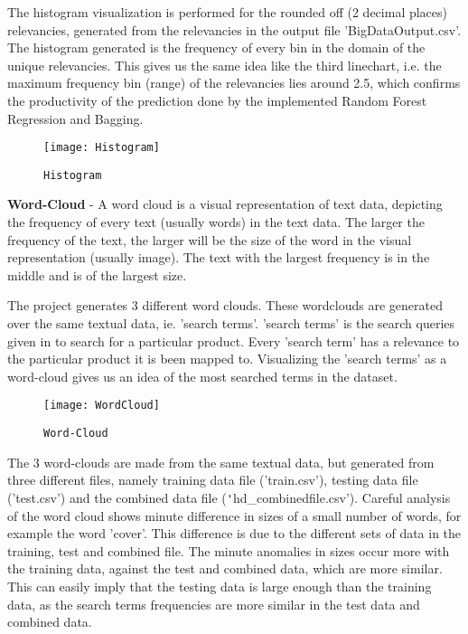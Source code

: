 \documentclass{sig-alternate-05-2015}
\begin{document}
The histogram visualization is performed for the rounded off (2 decimal places) relevancies, generated from the relevancies in the output file 'BigDataOutput.csv'. The histogram generated is the frequency of every bin in the domain of the unique relevancies. This gives us the same idea like the third linechart, i.e. the maximum frequency bin (range) of the relevancies lies around 2.5, which confirms the productivity of the prediction done by the implemented Random Forest Regression and Bagging.\\


\begin{figure}
\centering
\texttt{[image: Histogram]}
\caption{\texttt{Histogram}}
\end{figure}


\textbf{Word-Cloud} - A word cloud is a visual representation of text data, depicting the frequency of every text (usually words) in the text data. The larger the frequency of the text, the larger will be the size of the word in the visual representation (usually image). The text with the largest frequency is in the middle and is of the largest size. \cite{www-wikiTagCloud}


The project generates 3 different word clouds. These wordclouds are generated over the same textual data, ie. 'search terms'. 'search terms' is the search queries given in to search for a particular product. Every 'search term' has a relevance to the particular product it is been mapped to. Visualizing the 'search terms' as a word-cloud gives us an idea of the most searched terms in the dataset.

\begin{figure}
\centering
\texttt{[image: WordCloud]}
\caption{\texttt{Word-Cloud}}
\end{figure}


The 3 word-clouds are made from the same textual data, but generated from three different files, namely training data file ('train.csv'), testing data file ('test.csv') and the combined data file (\texttt'{hd\_combinedfile.csv}'). Careful analysis of the word cloud shows minute difference in sizes of a small number of words, for example the word 'cover'. This difference is due to the different sets of data in the training, test and combined file. The minute anomalies in sizes occur more with the training data, against the test and combined data, which are more similar. This can easily imply that the testing data is large enough than the training data, as the search terms frequencies are more similar in the test data and combined data.\\
\end{document}
